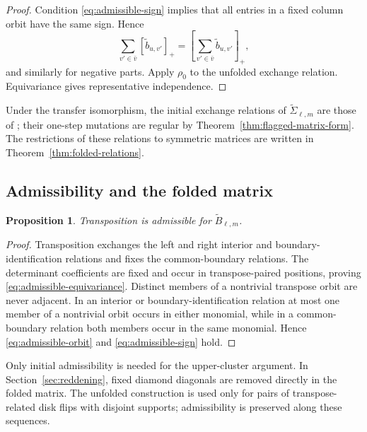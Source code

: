 \documentclass[11pt]{amsart}
\newtheorem{proposition}[theorem]{Proposition}
\theoremstyle{definition}
\theoremstyle{remark}
\begin{document}
\begin{proof}
Condition \eqref{eq:admissible-sign} implies that all entries in a fixed
column orbit have the same sign.  Hence
\[ \sum_{v'\in\bar v}[\widetilde b_{u,v'}]_+ =\left[\sum_{v'\in\bar v}\widetilde b_{u,v'}\right]_+, \]
and similarly for negative parts.  Apply $\rho_0$ to the unfolded exchange
relation.  Equivariance gives representative independence.
\end{proof}


Under the transfer isomorphism, the initial exchange relations of
$\widetilde\Sigma_{\ell,m}$ are those of
\cite[Corollaries~5.3--5.4]{FeiKroneckerII}; their one-step mutations are
regular by Theorem~\ref{thm:flagged-matrix-form}.  The restrictions of these
relations to symmetric matrices are written in
Theorem~\ref{thm:folded-relations}.

\subsection{Admissibility and the folded matrix}
\label{subsec:folded-matrix}

\begin{proposition}
\label{prop:transpose-admissible}
Transposition is admissible for $\widetilde B_{\ell,m}$.
\end{proposition}

\begin{proof}
Transposition exchanges the left and right interior and boundary-identification relations and
fixes the common-boundary relations.  The determinant coefficients are
fixed and occur in transpose-paired positions, proving
\eqref{eq:admissible-equivariance}.  Distinct members of a nontrivial transpose orbit are never adjacent.  In
an interior or boundary-identification relation at most one member of a nontrivial orbit occurs
in either monomial, while in a common-boundary relation both members occur
in the same monomial.  Hence \eqref{eq:admissible-orbit} and
\eqref{eq:admissible-sign} hold.
\end{proof}

Only initial admissibility is needed for the upper-cluster argument.
In Section~\ref{sec:reddening}, fixed diamond diagonals are removed directly
in the folded matrix.  The unfolded construction is used only for pairs of
transpose-related disk flips with disjoint supports; admissibility is
preserved along these sequences.
\end{document}
